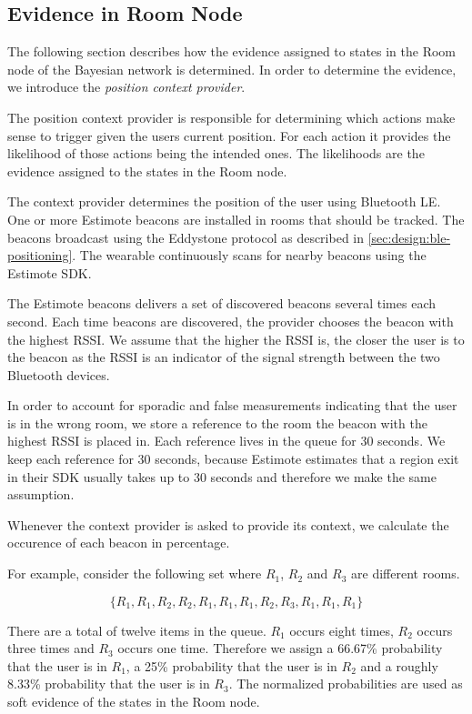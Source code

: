 \subsection{Evidence in Room Node}
\label{sec:design:bayesian-network:room-node-evidence}

The following section describes how the evidence assigned to states in the Room node of the Bayesian network is determined. In order to determine the evidence, we introduce the \emph{position context provider}.

The position context provider is responsible for determining which actions make sense to trigger given the users current position. For each action it provides the likelihood of those actions being the intended ones. The likelihoods are the evidence assigned to the states in the Room node.

The context provider determines the position of the user using Bluetooth LE. One or more Estimote beacons are installed in rooms that should be tracked. The beacons broadcast using the Eddystone protocol as described in \cref{sec:design:ble-positioning}. The wearable continuously scans for nearby beacons using the Estimote SDK.

The Estimote beacons delivers a set of discovered beacons several times each second. Each time beacons are discovered, the provider chooses the beacon with the highest RSSI. We assume that the higher the RSSI is, the closer the user is to the beacon as the RSSI is an indicator of the signal strength between the two Bluetooth devices.

In order to account for sporadic and false measurements indicating that the user is in the wrong room, we store a reference to the room the beacon with the highest RSSI is placed in. Each reference lives in the queue for 30 seconds. We keep each reference for 30 seconds, because Estimote estimates that a region exit in their SDK usually takes up to 30 seconds \cite{estimote:beacon-monitoring} and therefore we make the same assumption.

Whenever the context provider is asked to provide its context, we calculate the occurence of each beacon in percentage.

For example, consider the following set where $R_1$, $R_2$ and $R_3$ are different rooms.

\begin{equation*}
  \{ R_1, R_1, R_2, R_2, R_1, R_1, R_1, R_2, R_3, R_1, R_1, R_1 \}
\end{equation*}

There are a total of twelve items in the queue. $R_1$ occurs eight times, $R_2$ occurs three times and $R_3$ occurs one time. Therefore we assign a 66.67\% probability that the user is in $R_1$, a 25\% probability that the user is in $R_2$ and a roughly 8.33\% probability that the user is in $R_3$. The normalized probabilities are used as soft evidence of the states in the Room node.

